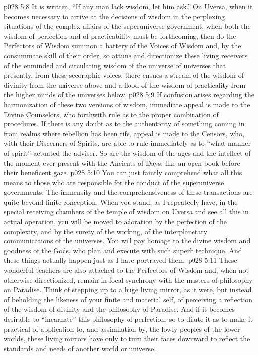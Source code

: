 \vs p028 5:8 It is written, “If any man lack wisdom, let him ask.” On Uversa, when it becomes necessary to arrive at the decisions of wisdom in the perplexing situations of the complex affairs of the superuniverse government, when both the wisdom of perfection and of practicability must be forthcoming, then do the Perfectors of Wisdom summon a battery of the Voices of Wisdom and, by the consummate skill of their order, so attune and directionize these living receivers of the enminded and circulating wisdom of the universe of universes that presently, from these secoraphic voices, there ensues a stream of the wisdom of divinity from the universe above and a flood of the wisdom of practicality from the higher minds of the universes below.
\vs p028 5:9 If confusion arises regarding the harmonization of these two versions of wisdom, immediate appeal is made to the Divine Counselors, who forthwith rule as to the proper combination of procedures. If there is any doubt as to the authenticity of something coming in from realms where rebellion has been rife, appeal is made to the Censors, who, with their Discerners of Spirits, are able to rule immediately as to “what manner of spirit” actuated the adviser. So are the wisdom of the ages and the intellect of the moment ever present with the Ancients of Days, like an open book before their beneficent gaze.
\vs p028 5:10 You can just faintly comprehend what all this means to those who are responsible for the conduct of the superuniverse governments. The immensity and the comprehensiveness of these transactions are quite beyond finite conception. When you stand, as I repeatedly have, in the special receiving chambers of the temple of wisdom on Uversa and see all this in actual operation, you will be moved to adoration by the perfection of the complexity, and by the surety of the working, of the interplanetary communications of the universes. You will pay homage to the divine wisdom and goodness of the Gods, who plan and execute with such superb technique. And these things actually happen just as I have portrayed them.
\pc \vs p028 5:11 \bibnobreakspace {} These wonderful teachers are also attached to the Perfectors of Wisdom and, when not otherwise directionized, remain in focal synchrony with the masters of philosophy on Paradise. Think of stepping up to a huge living mirror, as it were, but instead of beholding the likeness of your finite and material self, of perceiving a reflection of the wisdom of divinity and the philosophy of Paradise. And if it becomes desirable to “incarnate” this philosophy of perfection, so to dilute it as to make it practical of application to, and assimilation by, the lowly peoples of the lower worlds, these living mirrors have only to turn their faces downward to reflect the standards and needs of another world or universe.
